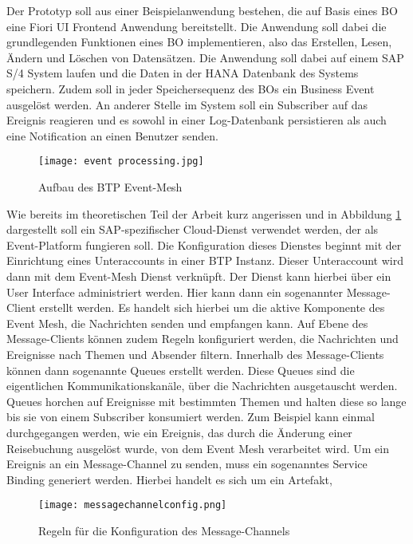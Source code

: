   Der Prototyp soll aus einer Beispielanwendung bestehen, die auf Basis eines \ac{BO} eine Fiori UI Frontend Anwendung bereitstellt. Die Anwendung soll dabei die grundlegenden Funktionen eines \ac{BO} implementieren, also das Erstellen, Lesen, Ändern und Löschen von Datensätzen. Die Anwendung soll dabei auf einem SAP S/4 System laufen und die Daten in der HANA Datenbank des Systems speichern. Zudem soll in jeder Speichersequenz des \ac{BO}s ein Business Event ausgelöst werden. An anderer Stelle im System soll ein Subscriber auf das Ereignis reagieren und es sowohl in einer Log-Datenbank persistieren als auch eine Notification an einen Benutzer senden.  
  \begin{figure}[H]
    \centering
    \texttt{[image: event processing.jpg]}
    \caption[BTP Event-Mesh]{Aufbau des BTP Event-Mesh \footnotemark}
    \label{EMprocessing}
  \end{figure}
  Wie bereits im theoretischen Teil der Arbeit kurz angerissen und in Abbildung \ref{EMprocessing} dargestellt soll ein SAP-spezifischer Cloud-Dienst verwendet werden, der als Event-Platform fungieren soll. Die Konfiguration dieses Dienstes beginnt mit der Einrichtung eines Unteraccounts in einer \ac{BTP} Instanz. Dieser Unteraccount wird dann mit dem Event-Mesh Dienst verknüpft. Der Dienst kann hierbei über ein User Interface administriert werden. Hier kann dann ein sogenannter Message-Client erstellt werden. Es handelt sich hierbei um die aktive Komponente des Event Mesh, die Nachrichten senden und empfangen kann. Auf Ebene des Message-Clients können zudem Regeln konfiguriert werden, die Nachrichten und Ereignisse nach Themen und Absender filtern. Innerhalb des Message-Clients können dann sogenannte Queues erstellt werden. Diese Queues sind die eigentlichen Kommunikationskanäle, über die Nachrichten ausgetauscht werden. Queues horchen auf Ereignisse mit bestimmten Themen und halten diese so lange bis sie von einem Subscriber konsumiert werden. Zum Beispiel kann einmal durchgegangen werden, wie ein Ereignis, das durch die Änderung einer Reisebuchung ausgelöst wurde, von dem Event Mesh verarbeitet wird. Um ein Ereignis an ein Message-Channel zu senden, muss ein sogenanntes Service Binding generiert werden. Hierbei handelt es sich um ein Artefakt, 
   \begin{wrapfigure}{l}{7cm}
   \centering
   \texttt{[image: messagechannelconfig.png]}
   \caption[Message-Channel Konfiguration]{Regeln für die Konfiguration des Message-Channels \footnotemark}
   \label{MesChannelConfig}
 \end{wrapfigure}
